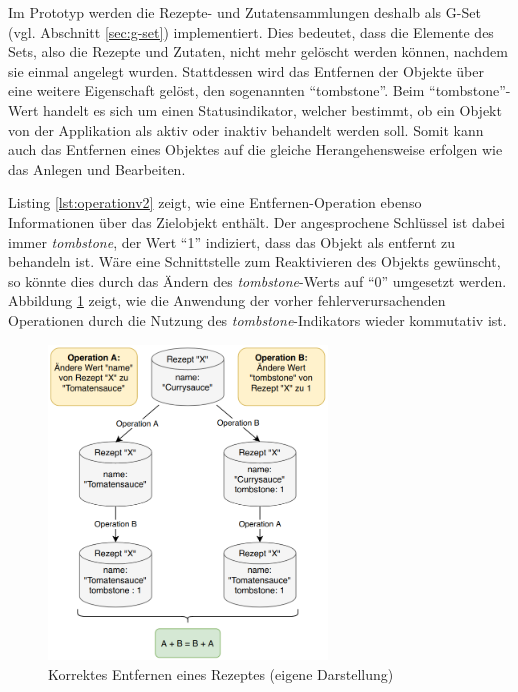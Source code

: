 \documentclass[a4paper, 12pt]{scrreprt}
\begin{document}
Im Prototyp werden die Rezepte- und Zutatensammlungen deshalb als G-Set (vgl. Abschnitt \ref{sec:g-set}) implementiert. Dies bedeutet, dass die Elemente des Sets, also die Rezepte und Zutaten, nicht mehr gelöscht werden können, nachdem sie einmal angelegt wurden. Stattdessen wird das Entfernen der Objekte über eine weitere Eigenschaft gelöst, den sogenannten \enquote{tombstone}. Beim \enquote{tombstone}-Wert handelt es sich um einen Statusindikator, welcher bestimmt, ob ein Objekt von der Applikation als aktiv oder inaktiv behandelt werden soll. Somit kann auch das Entfernen eines Objektes auf die gleiche Herangehensweise erfolgen wie das Anlegen und Bearbeiten.

\begin{minipage}{\linewidth}
	
\end{minipage}

Listing \ref{lst:operationv2} zeigt, wie eine Entfernen-Operation ebenso Informationen über das Zielobjekt enthält. Der angesprochene Schlüssel ist dabei immer \textit{tombstone}, der Wert \enquote{1} indiziert, dass das Objekt als entfernt zu behandeln ist. Wäre eine Schnittstelle zum Reaktivieren des Objekts gewünscht, so könnte dies durch das Ändern des \textit{tombstone}-Werts auf \enquote{0} umgesetzt werden. Abbildung \ref{fig:rezeptLöschenGut} zeigt, wie die Anwendung der vorher fehlerverursachenden Operationen durch die Nutzung des \textit{tombstone}-Indikators wieder kommutativ ist.

\begin{figure}[H]
	\centering
	\includegraphics[width=0.66\textwidth]{deleteRecipeGood.png}
	\caption[Korrektes Entfernen eines Rezeptes]{Korrektes Entfernen eines Rezeptes (eigene Darstellung)}
	\label{fig:rezeptLöschenGut}
\end{figure}
\end{document}
